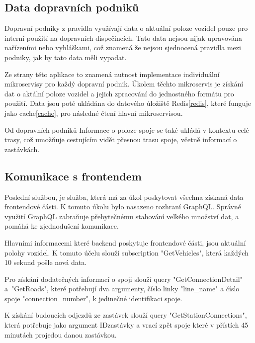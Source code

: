 \subsection {Data dopravních podniků}
Dopravní podniky z pravidla využívají data o aktuální poloze vozidel pouze pro interní použití na dopravních dispečincích. Tato data nejsou nijak upravována nařízeními nebo vyhláškami, což znamená že nejsou sjednocená pravidla mezi podniky, jak by tato data měli vypadat.\par
Ze strany této aplikace to znamená nutnost implementace individuální mikroservisy pro každý dopravní podnik. Úkolem těchto mikroservis je získání dat o aktální poloze vozidel a jejich zpracování do jednostného formátu pro použití. Data jsou poté ukládána do datového úložiště Redis\ref{redis}, které funguje jako cache\ref{cache},  pro následné čtení hlavní mikroservisou.\par
Od dopravních podniků
Informace o poloze spoje se také ukládá v kontextu celé trasy, což umožňuje cestujícím vidět přesnou trasu spoje, včetně informací o zastávkách.
\subsection {Komunikace s frontendem}\label{mainBackend}
Poslední službou, je služba, která má za úkol poskytovat všechna získaná data frontendové části. K tomuto úkolu bylo nasazeno rozhraní GraphQL. Správné využití GraphQL zabraňuje přebytečnému stahování velkého množství dat, a pomáhá ke zjednodušení komunikace.\par
Hlavními informacemi které backend poskytuje frontendové části, jsou aktuální polohy vozidel. K tomuto účelu slouží subscription "GetVehicles", která každých 10 sekund pošle nová data.\par
Pro získání dodatečných informací o spoji slouží query "\mbox{GetConnectionDetail}" \newline a~"\mbox{GetRoads}", které potřebují dva argumenty, číslo linky "\mbox{line\_name}" \newline a číslo spoje "\mbox{connection\_number}", k jedinečné identifikaci spoje.\par
K získání budoucích odjezdů ze zastávek slouží query "GetStationConnections", která potřebuje jako argument IDzastávky a vrací zpět spoje které v přístích 45 minutách projedou danou zastávkou.
